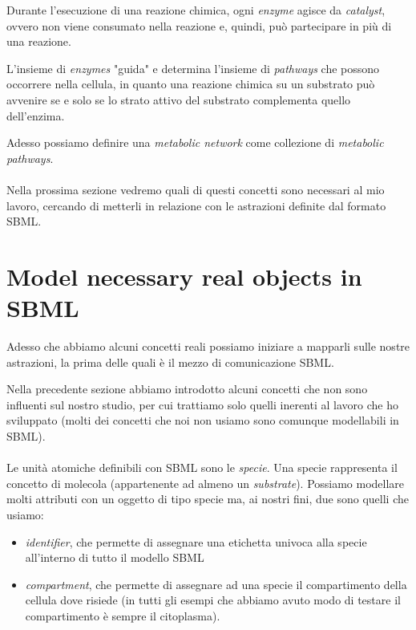 Durante l'esecuzione di una reazione chimica, ogni \emph{enzyme}
agisce da \emph{catalyst}, ovvero non viene consumato nella reazione
e, quindi, pu\`o partecipare in pi\`u di una reazione.

L'insieme di \emph{enzymes} "guida" e determina l'insieme di
\emph{pathways} che possono occorrere nella cellula, in quanto una
reazione chimica su un substrato pu\`o avvenire se e solo se lo strato
attivo del substrato complementa quello dell'enzima.

Adesso possiamo definire una \emph{metabolic network} come collezione
di \emph{metabolic pathways}.
\\\\
Nella prossima sezione vedremo quali di questi concetti sono necessari
al mio lavoro, cercando di metterli in relazione con le astrazioni
definite dal formato SBML.

\section{Model necessary real objects in SBML}
\label{sec:necessaryRealObjectsModeledInSBML}
Adesso che abbiamo alcuni concetti reali possiamo iniziare a mapparli
sulle nostre astrazioni, la prima delle quali \`e il mezzo di
comunicazione SBML.

Nella precedente sezione abbiamo introdotto alcuni concetti che non
sono influenti sul nostro studio, per cui trattiamo solo quelli
inerenti al lavoro che ho sviluppato (molti dei concetti che noi non
usiamo sono comunque modellabili in SBML).
\\\\
Le unit\`a atomiche definibili con SBML sono le \emph{specie}. Una
specie rappresenta il concetto di molecola (appartenente ad almeno un
\emph{substrate}). Possiamo modellare molti attributi con un oggetto
di tipo specie ma, ai nostri fini, due sono quelli che usiamo:
\begin{itemize}
\item \emph{identifier}, che permette di assegnare una etichetta univoca
alla specie all'interno di tutto il modello SBML
\item \emph{compartment}, che permette di assegnare ad una specie il
compartimento della cellula dove risiede (in tutti gli esempi che
abbiamo avuto modo di testare il compartimento \`e sempre il
citoplasma).
\end{itemize}

